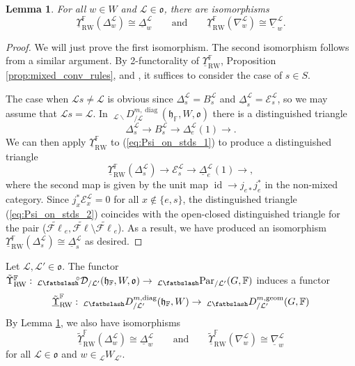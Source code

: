 \documentclass{amsart}
\newcommand{\F}{\mathbb{F}}
\newcommand{\scrE}{\mathcal{E}}
\newcommand{\scrL}{\mathcal{L}}
\DeclareMathOperator{\id}{id}
\newcommand{\fr}[1]{\mathfrak{#1}}
\DeclareMathOperator{\RW}{RW}
\DeclareMathOperator{\diag}{diag}
\newcommand{\eFl}{\widetilde{\mathcal{F}\ell}}
\DeclareMathOperator{\geom}{geom}
\newcommand{\DGME}[2]{\:_{#1 \smallleftdash} D_{/ #2}^{m, \geom}}
\newcommand{\PME}[2]{\:_{#1 \smallleftdash} \textnormal{Par}_{/ #2} }
\newcommand{\unabla}{\underline{\nabla}}
\newcommand{\uDelta}{\underline{\Delta}}
\newcommand{\grEWmonME}[2]{\:_{#1 \smallleftdash} \!\!{}^{\circ} \mathcal{D}_{/ #2} }
\newcommand{\DDBE}[2]{\:_{#1 \backslash} D_{/ #2}^{m, \diag}}
\newcommand{\DDME}[2]{\:_{#1 \smallleftdash} D_{/ #2}^{m, \diag}}
\newcommand{\W}[2]{{}_{#1}W_{#2}}
\newcommand{\bfslash}{\mathbin{\fatbslash}}
\newcommand*\smallleftdash{\bfslash}
\newtheorem{lemma}[subsubsection]{Lemma}
\theoremstyle{definition}
\numberwithin{equation}{subsection}
\begin{document}
\begin{lemma}\label{lem:Psi_on_stds}
  For all $w \in W$ and $\scrL \in \fr{o}$, there are isomorphisms
  \[\underline{\Upsilon}_{\RW}^{\F} (\Delta_w^{\scrL}) \cong \uDelta_w^{\scrL} \qquad \text{and} \qquad \underline{\Upsilon}_{\RW}^{\F} (\nabla_w^{\scrL}) \cong \unabla_w^{\scrL}.  \]
\end{lemma}
\begin{proof}
  We will just prove the first isomorphism. The second isomorphism follows from a similar argument.
  By 2-functorality of $\underline{\Upsilon}_{\RW}^{\F}$, Proposition \ref{prop:mixed_conv_rules}, and \cite[Proposition 3.9.6]{Sandvik}, it suffices to consider the case of $s \in S$.
  
  The case when $\scrL s \neq \scrL$ is obvious since $\Delta_s^{\scrL} = B_s^{\scrL}$ and $\uDelta_s^{\scrL} = \scrE_s^{\scrL}$, so we may assume that $\scrL s = \scrL$.
  In $\DDBE{\scrL}{\scrL} (\fr{h}_{\F}, W, \fr{o})$ there is a distinguished triangle
  \begin{equation}\label{eq:Psi_on_stds_1}
    \Delta_s^{\scrL} \to B_s^{\scrL} \to \Delta_e^{\scrL} (1) \to.
  \end{equation}
  We can then apply $\underline{\Upsilon}_{\RW}^{\F}$ to (\ref{eq:Psi_on_stds_1}) to produce a distinguished triangle
  \begin{equation}\label{eq:Psi_on_stds_2}
    \underline{\Upsilon}_{\RW}^{\F} \left( \Delta_s^{\scrL} \right) \to \scrE_{s}^{\scrL} \to \uDelta_e^{\scrL} (1) \to,
  \end{equation}
  where the second map is given by the unit map $\id \to j_{e*} j_e^*$ in the non-mixed category.
  Since $j_x^* \scrE_x^{\scrL} = 0$ for all $x \notin \{e,s\}$, the distinguished triangle (\ref{eq:Psi_on_stds_2}) coincides with the open-closed distinguished triangle for the pair ($\eFl_{e}, \eFl \setminus \eFl_e$).
  As a result, we have produced an isomorphism $ \underline{\Upsilon}_{\RW}^{\F} \left( \Delta_s^{\scrL} \right) \cong \uDelta_s^{\scrL}$ as desired.
\end{proof}

Let $\scrL, \scrL' \in \fr{o}$.
The functor $\tilde{\Upsilon}_{\RW}^{\F} : \grEWmonME{\scrL}{\scrL'} (\fr{h}_{\F}, W, \fr{o}) \to \PME{\scrL}{\scrL'} (G, \F)$ induces a functor
\[\underline{\tilde{\Upsilon}}_{\RW}^{\F} : \DDME{\scrL}{\scrL'} (\fr{h}_{\F}, W) \to \DGME{\scrL}{\scrL'} (G, \F)\]
By Lemma \ref{lem:Psi_on_stds}, we also have isomorphisms
\begin{equation}\label{eq:ME_Psi_on_stds}
  \underline{\tilde{\Upsilon}}_{\RW}^{\F} (\Delta_w^{\scrL}) \cong \uDelta_w^{\scrL} \qquad \text{and} \qquad \underline{\tilde{\Upsilon}}_{\RW}^{\F} (\nabla_w^{\scrL}) \cong \unabla_w^{\scrL} 
\end{equation}
for all $\scrL \in \fr{o}$ and $w \in \W{\scrL}{\scrL'}$.
\end{document}
